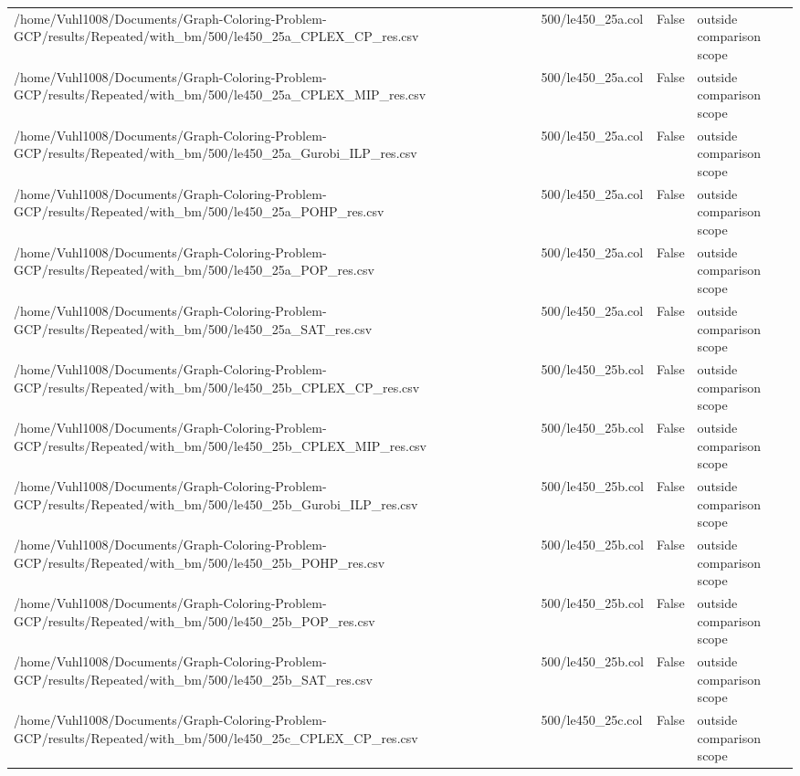 \begin{table}[htbp]
\begin{tabular}{llll}
/home/Vuhl1008/Documents/Graph-Coloring-Problem-GCP/results/Repeated/with\_bm/500/le450\_25a\_CPLEX\_CP\_res.csv & 500/le450\_25a.col & False & outside comparison scope \\
/home/Vuhl1008/Documents/Graph-Coloring-Problem-GCP/results/Repeated/with\_bm/500/le450\_25a\_CPLEX\_MIP\_res.csv & 500/le450\_25a.col & False & outside comparison scope \\
/home/Vuhl1008/Documents/Graph-Coloring-Problem-GCP/results/Repeated/with\_bm/500/le450\_25a\_Gurobi\_ILP\_res.csv & 500/le450\_25a.col & False & outside comparison scope \\
/home/Vuhl1008/Documents/Graph-Coloring-Problem-GCP/results/Repeated/with\_bm/500/le450\_25a\_POHP\_res.csv & 500/le450\_25a.col & False & outside comparison scope \\
/home/Vuhl1008/Documents/Graph-Coloring-Problem-GCP/results/Repeated/with\_bm/500/le450\_25a\_POP\_res.csv & 500/le450\_25a.col & False & outside comparison scope \\
/home/Vuhl1008/Documents/Graph-Coloring-Problem-GCP/results/Repeated/with\_bm/500/le450\_25a\_SAT\_res.csv & 500/le450\_25a.col & False & outside comparison scope \\
/home/Vuhl1008/Documents/Graph-Coloring-Problem-GCP/results/Repeated/with\_bm/500/le450\_25b\_CPLEX\_CP\_res.csv & 500/le450\_25b.col & False & outside comparison scope \\
/home/Vuhl1008/Documents/Graph-Coloring-Problem-GCP/results/Repeated/with\_bm/500/le450\_25b\_CPLEX\_MIP\_res.csv & 500/le450\_25b.col & False & outside comparison scope \\
/home/Vuhl1008/Documents/Graph-Coloring-Problem-GCP/results/Repeated/with\_bm/500/le450\_25b\_Gurobi\_ILP\_res.csv & 500/le450\_25b.col & False & outside comparison scope \\
/home/Vuhl1008/Documents/Graph-Coloring-Problem-GCP/results/Repeated/with\_bm/500/le450\_25b\_POHP\_res.csv & 500/le450\_25b.col & False & outside comparison scope \\
/home/Vuhl1008/Documents/Graph-Coloring-Problem-GCP/results/Repeated/with\_bm/500/le450\_25b\_POP\_res.csv & 500/le450\_25b.col & False & outside comparison scope \\
/home/Vuhl1008/Documents/Graph-Coloring-Problem-GCP/results/Repeated/with\_bm/500/le450\_25b\_SAT\_res.csv & 500/le450\_25b.col & False & outside comparison scope \\
/home/Vuhl1008/Documents/Graph-Coloring-Problem-GCP/results/Repeated/with\_bm/500/le450\_25c\_CPLEX\_CP\_res.csv & 500/le450\_25c.col & False & outside comparison scope \\

\end{tabular}
\end{table}
